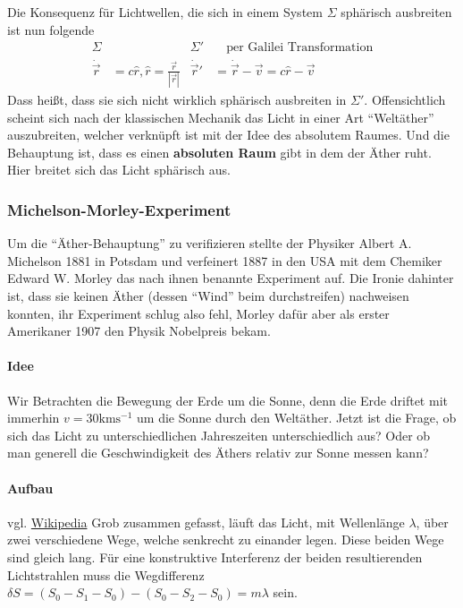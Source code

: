 \documentclass[oneside]{book}
\theoremstyle{definition}
\newcommand{\dotvec}[1]{\dot{\vec{#1}}}
\begin{document}
Die Konsequenz für Lichtwellen, die sich in einem System $\Sigma$ sphärisch ausbreiten ist nun folgende
\begin{align*}
	\Sigma& & \Sigma'& \text{~~~per Galilei Transformation}\\
	\dotvec{r} &= c \hat{r}, \hat{r} = \frac{\vec{r}}{|\vec{r}|} & \dotvec{r}' &= \dotvec{r} - \vec{v} = c \hat{r} - \vec{v}   
\end{align*}
Dass heißt, dass sie sich nicht wirklich sphärisch ausbreiten in $\Sigma'$. Offensichtlich scheint sich nach der klassischen Mechanik das Licht in einer Art "`Weltäther"' auszubreiten, welcher verknüpft ist mit der Idee des absolutem Raumes. Und die Behauptung ist, dass es einen \textbf{absoluten Raum} gibt in dem der Äther ruht. Hier breitet sich das Licht sphärisch aus.

\subsubsection{Michelson-Morley-Experiment}
Um die "`Äther-Behauptung"' zu verifizieren stellte der Physiker Albert A. Michelson 1881 in Potsdam und verfeinert 1887 in den USA mit dem Chemiker Edward W. Morley das nach ihnen benannte Experiment auf. Die Ironie dahinter ist, dass sie keinen Äther (dessen "`Wind"' beim durchstreifen) nachweisen konnten, ihr Experiment schlug also fehl, Morley dafür aber als erster Amerikaner 1907 den Physik Nobelpreis bekam.

\paragraph{Idee} Wir Betrachten die Bewegung der Erde um die Sonne, denn die Erde driftet mit immerhin $v = 30 \mathrm{km}\mathrm{s}^{-1}$ um die Sonne durch den Weltäther. Jetzt ist die Frage, ob sich das Licht zu unterschiedlichen Jahreszeiten unterschiedlich aus? Oder ob man generell die Geschwindigkeit des Äthers relativ zur Sonne messen kann?

\paragraph{Aufbau} vgl. \href{https://de.wikipedia.org/wiki/Michelson-Morley-Experiment}{Wikipedia}
Grob zusammen gefasst, läuft das Licht, mit Wellenlänge $\lambda$, über zwei verschiedene Wege, welche senkrecht zu einander legen. Diese beiden Wege sind gleich lang. Für eine konstruktive Interferenz der beiden resultierenden Lichtstrahlen muss die Wegdifferenz $\delta S = (S_0 - S_1 - S_0) - (S_0 - S_2 - S_0) = m \lambda$ sein.
\end{document}

